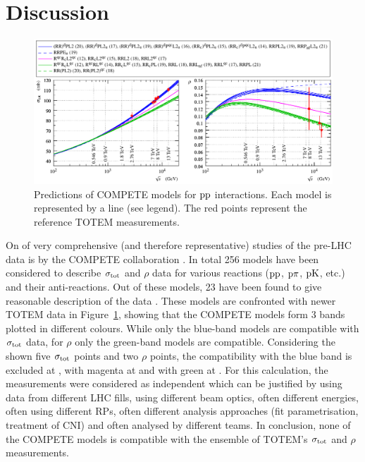 \section{Discussion}
\label{sec:discussion}

\begin{figure}
\vskip-5mm
\begin{center}
\includegraphics{fig/compete_bands_si_tot_rho.pdf}
\caption{%
Predictions of COMPETE models \cite{compete-details} for $\rm pp$ interactions. Each model is represented by a line (see legend). The red points represent the reference TOTEM measurements. 
}
\label{fig:comp bands}
\end{center}
\end{figure}

On of very comprehensive (and therefore representative) studies of the pre-LHC data is by the COMPETE collaboration \cite{compete}. In total 256 models have been considered to describe $\sigma_{\rm tot}$ and $\rho$ data for various reactions ($\rm pp$, $\rm p\pi$, $\rm pK$, etc.) and their anti-reactions. Out of these models, 23 have been found to give reasonable description of the data \cite{compete-details}. These models are confronted with newer TOTEM data in Figure~\ref{fig:comp bands}, showing that the COMPETE models form 3 bands plotted in different colours. While only the blue-band models are compatible with $\sigma_{\rm tot}$ data, for $\rho$ only the green-band models are compatible. Considering the shown five $\sigma_{\rm tot}$ points and two $\rho$ points, the compatibility with the blue band is excluded at , with magenta at  and with green at . For this calculation, the measurements were considered as independent which can be justified by using data from different LHC fills, using different beam optics, often different energies, often using different RPs, often different analysis approaches (fit parametrisation, treatment of CNI) and often analysed by different teams. In conclusion, none of the COMPETE models is compatible with the ensemble of TOTEM's $\sigma_{\rm tot}$ and $\rho$ measurements.

